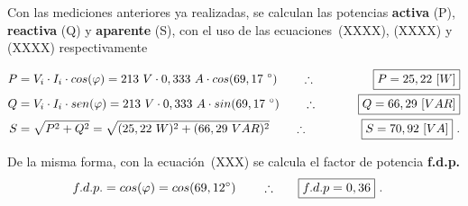     Con las mediciones anteriores ya realizadas, se calculan las potencias \textbf{activa} (P), \textbf{reactiva} (Q)
    y \textbf{aparente} (S), con el uso de las ecuaciones~(XXXX), (XXXX) y (XXXX) respectivamente

    \begin{align*}
      P &= V_i \cdot I_i \cdot cos(\varphi) = 213\ V \cdot 0,333\ A \cdot cos(69,17\ ^{\circ}) 
                                \hspace{20pt} \therefore \hspace{20pt} \Aboxed{P = 25,22\ [W]} \\
      Q &= V_i \cdot I_i \cdot sen(\varphi) = 213\ V \cdot 0,333\ A \cdot sin(69,17\ ^{\circ}) 
                                \hspace{20pt} \therefore \hspace{20pt} \Aboxed{Q = 66,29\ [VAR]} \\
      S &= \sqrt{P^2 + Q^2} =  \sqrt{(25,22\ W)^2 + (66,29\ VAR)^2}
                                \hspace{20pt} \therefore \hspace{20pt} \Aboxed{S = 70,92\ [VA]} \ .
    \end{align*}

    \noindent De la misma forma, con la ecuación~(XXX) se calcula el factor de potencia \textbf{f.d.p.}
    \begin{align*}
      f.d.p. = cos(\varphi) = cos(69,12 ^{\circ}) \hspace{20pt} \therefore \hspace{20pt} \Aboxed{f.d.p = 0,36}\ .
    \end{align*}



